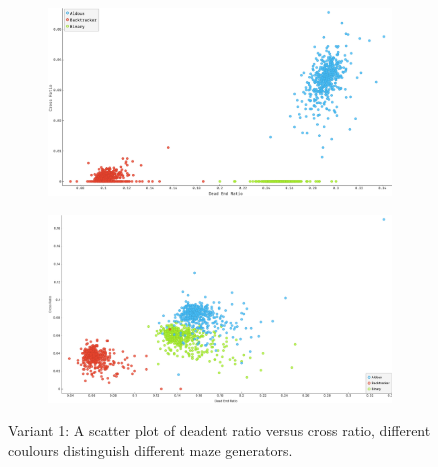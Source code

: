          \begin{figure}[!h]
            \centering
            \begin{subfigure}[!h]{0.47\textwidth}
                \includegraphics[scale = 0.17]{CrossVsDeadEnd_variant1.png}
               \caption{}
            \end{subfigure}
            \begin{subfigure}[!h]{0.47\textwidth}
                \includegraphics[scale = 0.17]{CrossVsDeadEnd_variant2.png}
               \caption{}
            \end{subfigure}
            \caption{Variant 1: A scatter plot of deadent ratio versus cross ratio, different coulours distinguish different maze generators.}
            \end{figure}
\newpage

